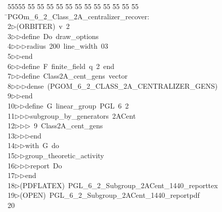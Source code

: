 %
%
\begin{tabbing}
55555 \= 55 \= 55 \= 55 \= 55 \= 55 \= 55 \= 55 \= 55 \= 55 \= 55 \= 55 \= 55 \= \>PGOm\_6\_2\_Class\_2A\_centralizer\_recover:\\[0pt]
2\>$\triangleright$\>(ORBITER)\ v\ 2\ \\[0pt]
3\>$\triangleright$\>$\triangleright$\>define\ Do\ draw\_options\ \\[0pt]
4\>$\triangleright$\>$\triangleright$\>$\triangleright$\>radius\ 200\ line\_width\ 03\ \\[0pt]
5\>$\triangleright$\>$\triangleright$\>end\ \\[0pt]
6\>$\triangleright$\>$\triangleright$\>define\ F\ finite\_field\ q\ 2\ end\ \\[0pt]
7\>$\triangleright$\>$\triangleright$\>define\ Class2A\_cent\_gens\ vector\ \\[0pt]
8\>$\triangleright$\>$\triangleright$\>$\triangleright$\>dense\ (PGOM\_6\_2\_CLASS\_2A\_CENTRALIZER\_GENS)\ \\[0pt]
9\>$\triangleright$\>$\triangleright$\>end\ \\[0pt]
10\>$\triangleright$\>$\triangleright$\>define\ G\ linear\_group\ PGL\ 6\ 2\ \\[0pt]
11\>$\triangleright$\>$\triangleright$\>$\triangleright$\>subgroup\_by\_generators\ 2ACent\ \\[0pt]
12\>$\triangleright$\>$\triangleright$\>$\triangleright$\ 9\ Class2A\_cent\_gens\ \\[0pt]
13\>$\triangleright$\>$\triangleright$\>$\triangleright$\>end\ \\[0pt]
14\>$\triangleright$\>$\triangleright$\>with\ G\ do\ \\[0pt]
15\>$\triangleright$\>$\triangleright$\>group\_theoretic\_activity\ \\[0pt]
16\>$\triangleright$\>$\triangleright$\>$\triangleright$\>report\ Do\ \\[0pt]
17\>$\triangleright$\>$\triangleright$\>end\\[0pt]
18\>$\triangleright$\>(PDFLATEX)\ PGL\_6\_2\_Subgroup\_2ACent\_1440\_reporttex\\[0pt]
19\>$\triangleright$\>(OPEN)\ PGL\_6\_2\_Subgroup\_2ACent\_1440\_reportpdf\\[0pt]
20\>\end{tabbing}
